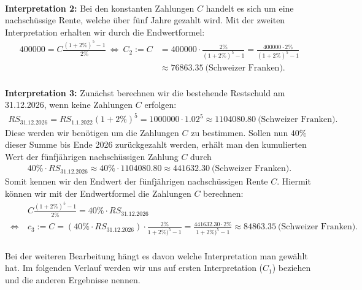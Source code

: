 \ \\
\textbf{Interpretation 2:}
Bei den konstanten Zahlungen $C$ handelt es sich um eine nachschüssige Rente, welche über fünf Jahre gezahlt wird.
Mit der zweiten Interpretation erhalten wir durch die Endwertformel:
\begin{align*}
	400 000
	=
	C \frac{(1+2\%)^5 -1 }{2 \%}
	\ \Leftrightarrow \
	C_2 := C
	&= 400 000 \cdot
	\frac{2 \%}{(1+2\%)^5 -1}
	=
	\frac{ 400 000 \cdot 2 \%}{(1+2\%)^5 -1}\\
	&\approx
	76 863.35
	\ \textrm{(Schweizer Franken)}.
\end{align*}
\ \\
\textbf{Interpretation 3:}
Zunächst berechnen wir die bestehende Restschuld am 31.12.2026, wenn keine Zahlungen $C$ erfolgen:
\begin{align*}
	RS_{\mathrm{31.12.2026}}
	=
	RS_{\mathrm{1.1.2022}} ( 1+ 2 \%)^5
	=
	1 000 000 \cdot 1.02^5 
	\approx
	1 104 080.80 \ \textrm{(Schweizer Franken)}.
\end{align*}
Diese werden wir benötigen um die Zahlungen $C$ zu bestimmen.
Sollen nun $40 \% $ dieser Summe bis Ende 2026 zurückgezahlt werden, erhält man den kumulierten Wert der fünfjährigen nachschüssigen Zahlung $C$ durch
\begin{align*}
	40 \% \cdot RS_{\mathrm{31.12.2026}}
	\approx
	40 \% \cdot	1 104 080.80
	\approx
	441 632.30 \ \textrm{(Schweizer Franken)}.
\end{align*}
Somit kennen wir den Endwert der fünfjährigen nachschüssigen Rente $C$. Hiermit können wir mit der Endwertformel die Zahlungen $C$ berechnen:
\begin{align*}
	&C \frac{(1+2\%)^5 -1 }{2 \%} = 40 \% \cdot RS_{\mathrm{31.12.2026}}\\
	\ \Leftrightarrow \
	&c_3 := C 
	= (40 \% \cdot RS_{\mathrm{31.12.2026}}) \cdot \frac{2 \%}{1+2\%)^5 -1 }
	=
	\frac{441 632.30  \cdot 2 \%}{1+2\%)^5 -1 }
	\approx 84 863.35
	\ \textrm{(Schweizer Franken)}.
\end{align*}
\ \\
Bei der weiteren Bearbeitung hängt es davon welche Interpretation man gewählt hat. Im folgenden Verlauf werden wir uns auf ersten Interpretation ($C_1$) beziehen und die anderen Ergebnisse nennen.

